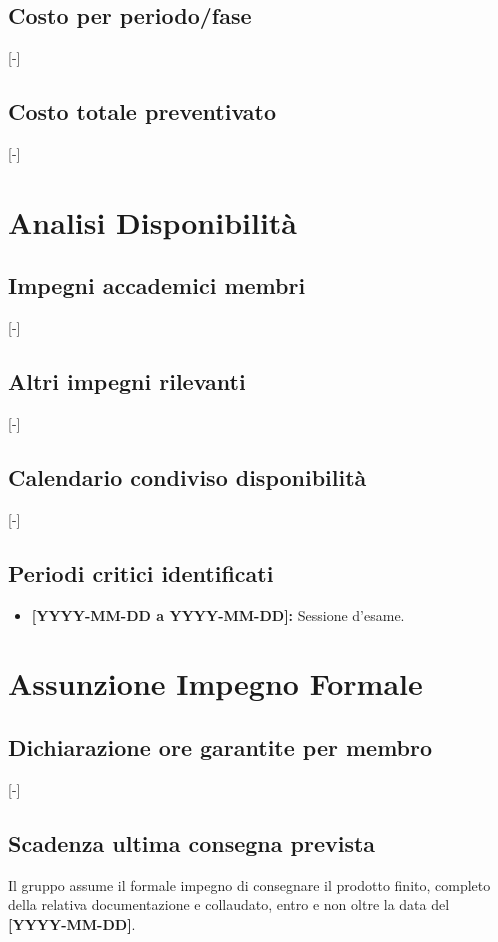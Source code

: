 \documentclass[11pt, a4paper]{article}
\begin{document}
	\subsection{Costo per periodo/fase}
	[-]
	
	\subsection{Costo totale preventivato}
	[-]
	
	\section{Analisi Disponibilità}
	
	\subsection{Impegni accademici membri}
	[-]
	
	\subsection{Altri impegni rilevanti}
	[-]
	
	\subsection{Calendario condiviso disponibilità}
	[-]
	
	\subsection{Periodi critici identificati}
	\begin{itemize}
		\item \textbf{{[YYYY-MM-DD a YYYY-MM-DD]}:} Sessione d'esame.
	\end{itemize}
	
	\newpage
	\section{Assunzione Impegno Formale}
	
	\subsection{Dichiarazione ore garantite per membro}
	[-]
	
	\subsection{Scadenza ultima consegna prevista}
	Il gruppo assume il formale impegno di consegnare il prodotto finito, completo della relativa documentazione e collaudato, entro e non oltre la data del \textbf{{[YYYY-MM-DD]}}.
	
\end{document}
